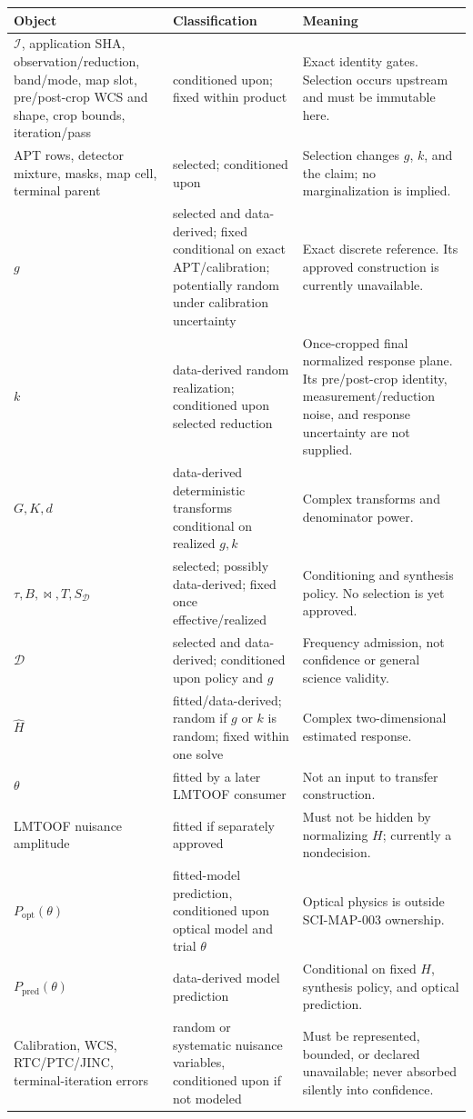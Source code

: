 \documentclass[11pt]{article}
\begin{document}
\begin{longtable}{@{}L{0.18\textwidth}L{0.22\textwidth}L{0.51\textwidth}@{}}
\toprule
Object & Classification & Meaning \\
\midrule
\endhead
$\mathcal I$, application SHA, observation/reduction, band/mode, map slot,
pre/post-crop WCS and shape, crop bounds, iteration/pass & conditioned upon;
fixed within product & Exact
identity gates.  Selection occurs upstream and must be immutable here. \\
APT rows, detector mixture, masks, map cell, terminal parent & selected;
conditioned upon & Selection changes $g$, $k$, and the claim; no marginalization
is implied. \\
$g$ & selected and data-derived; fixed conditional on exact APT/calibration;
potentially random under calibration uncertainty & Exact discrete reference.
Its approved construction is currently unavailable. \\
$k$ & data-derived random realization; conditioned upon selected reduction &
Once-cropped final normalized response plane.  Its pre/post-crop identity,
measurement/reduction noise, and response uncertainty are not supplied. \\
$G,K,d$ & data-derived deterministic transforms conditional on realized
$g,k$ & Complex transforms and denominator power. \\
$\tau,B,\bowtie,T,S_{\mathcal D}$ & selected; possibly data-derived; fixed once
effective/realized & Conditioning and synthesis policy.  No selection is yet
approved. \\
$\mathcal D$ & selected and data-derived; conditioned upon policy and $g$ &
Frequency admission, not confidence or general science validity. \\
$\widehat H$ & fitted/data-derived; random if $g$ or $k$ is random; fixed within
one solve & Complex two-dimensional estimated response. \\
$\theta$ & fitted by a later LMTOOF consumer & Not an input to transfer
construction. \\
LMTOOF nuisance amplitude & fitted if separately approved & Must not be hidden
by normalizing $H$; currently a nondecision. \\
$P_{\mathrm{opt}}(\theta)$ & fitted-model prediction, conditioned upon optical
model and trial $\theta$ & Optical physics is outside SCI-MAP-003 ownership. \\
$P_{\mathrm{pred}}(\theta)$ & data-derived model prediction & Conditional on
fixed $H$, synthesis policy, and optical prediction. \\
Calibration, WCS, RTC/PTC/JINC, terminal-iteration errors & random or systematic
nuisance variables, conditioned upon if not modeled & Must be represented,
bounded, or declared unavailable; never absorbed silently into confidence. \\
\bottomrule
\end{longtable}
\end{document}
